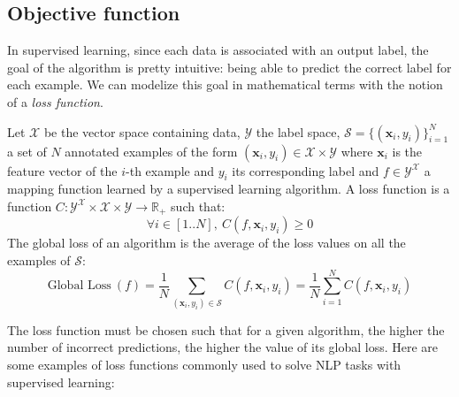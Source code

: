   \subsection{Objective function}
    \label{ch02:subsec:objective-function}
    In supervised learning, since each data is associated with an output label,
    the goal of the algorithm is pretty intuitive: being able to predict the
    correct label for each example. We can modelize this goal in mathematical
    terms with the notion of a \textit{loss function}.

    \theoremstyle{definition}
    \begin{definition}
      Let $\mathcal{X}$ be the vector space containing data, $\mathcal{Y}$ the
      label space, $\mathcal{S} = \{(\mathbf{x}_i, y_i)\}_{i = 1}^N$ a set of
      $N$ annotated examples of the form $(\mathbf{x}_i, y_i) \in \mathcal{X}
      \times \mathcal{Y}$ where $\mathbf{x}_i$ is the feature vector of the
      $i$-th example and $y_i$ its corresponding label and $f \in
      \mathcal{Y}^\mathcal{X}$ a mapping function learned by a supervised
      learning algorithm. A loss function is a function $C:
      \mathcal{Y}^\mathcal{X} \times \mathcal{X} \times \mathcal{Y} \to
      \mathbb{R}_{+}$ such that:
      \begin{equation}
        \forall i \in [1..N], ~ C(f, \mathbf{x}_i, y_i) \geq 0
      \end{equation}
      The global loss of an algorithm is the average of the loss values on all
      the examples of $\mathcal{S}$:
      \begin{equation}
        \text{Global Loss}~(f) = \frac{1}{N}
        \sum_{(\mathbf{x}_i, y_i) \in \mathcal{S}} C(f, \mathbf{x}_i, y_i) =
        \frac{1}{N} \sum_{i = 1}^N C(f, \mathbf{x}_i, y_i)
      \end{equation}
    \end{definition}

    \pagebreak
    The loss function must be chosen such that for a given algorithm,
    the higher the number of incorrect predictions, the higher the value of its
    global loss. Here are some examples of loss functions commonly used to solve
    NLP tasks with supervised learning:

